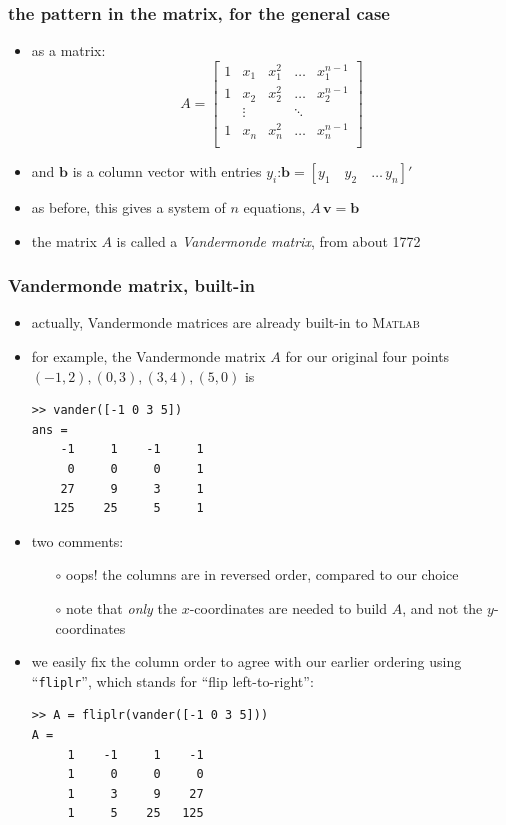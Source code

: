 \documentclass[10pt,hyperref]{beamer}
\newcommand{\bb}{\mathbf{b}}
\newcommand{\bv}{\mathbf{v}}
\newcommand{\Matlab}{\textsc{Matlab}\xspace}
\newcommand{\MO}{\Matlab}
\begin{document}
\begin{frame}[fragile]
\frametitle{the pattern in the matrix, for the general case}

\begin{itemize}
\item as a matrix:
	$$A = \begin{bmatrix}
	1 & x_1 & x_1^2 & \dots & x_1^{n-1} \\
	1 & x_2 & x_2^2 & \dots & x_2^{n-1} \\
	 & \vdots & & \ddots &  \\
	1 & x_n & x_n^2 & \dots & x_n^{n-1} \\
	\end{bmatrix}$$
\item and $\bb$ is a column vector with entries $y_i$:\quad  $\bb = [y_1\quad y_2 \quad \dots \, y_n]'$
\item as before, this gives a system of $n$ equations, \quad $A\, \bv = \bb$
\item the matrix $A$ is called a \emph{Vandermonde matrix}, from about 1772
\end{itemize}
\end{frame}


\begin{frame}[fragile]
\frametitle{Vandermonde matrix, built-in}

\begin{itemize}
\item actually, Vandermonde matrices are already built-in to \MO
\item for example, the Vandermonde matrix $A$ for our original four points $(-1,2), (0,3), (3,4), (5,0)$ is

\begin{Verbatim}[frame=single,fontfamily=courier,fontsize=\scriptsize]
>> vander([-1 0 3 5])
ans =
    -1     1    -1     1
     0     0     0     1
    27     9     3     1
   125    25     5     1
\end{Verbatim}
\item two comments:
  \begin{itemize}
  \item[$\circ$] oops!  the columns are in reversed order, compared to our choice
  \item[$\circ$] note that \emph{only} the $x$-coordinates are needed to build $A$, and not the $y$-coordinates
  \end{itemize}
\item we easily fix the column order to agree with our earlier ordering using ``\texttt{fliplr}'', which stands for ``flip left-to-right'':
\begin{Verbatim}[frame=single,fontfamily=courier,fontsize=\scriptsize]
>> A = fliplr(vander([-1 0 3 5]))
A =
     1    -1     1    -1
     1     0     0     0
     1     3     9    27
     1     5    25   125
\end{Verbatim}
\end{itemize}
\end{frame}
\end{document}
